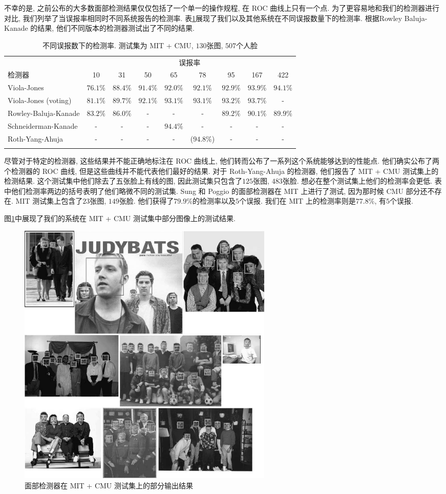 \documentclass[a4paper,utf8,11pt, onecolumn]{ctexart}
\begin{document}
不幸的是, 之前公布的大多数面部检测结果仅仅包括了一个单一的操作规程, 在 ROC 曲线上只有一个点.
为了更容易地和我们的检测器进行对比, 我们列举了当误报率相同时不同系统报告的检测率. 表\ref{tab:false}展现了我们以及其他系统在不同误报数量下的检测率. 根据Rowley Baluja-Kanade 的结果\citep{rowley1998neural}, 他们不同版本的检测器测试出了不同的结果.
\begin{table}
\centering
\begin{tabular}{lcccccccc}
\firsthline
&\multicolumn{8}{c}{误报率} \\
\cline{2-9}
检测器 & 10 & 31 & 50 & 65 & 78 & 95 & 167 & 422 \\
\hline
Viola-Jones & $76.1\%$ & $88.4\%$ & $91.4\%$ & $92.0\%$ & $92.1\%$ & $92.9\%$ & $93.9\%$ & $94.1\%$ \\
Viola-Jones (voting) & $81.1\%$ & $89.7\%$ & $92.1\%$ & $93.1\%$ & $93.1\%$ & $93.2\%$ & $93.7\%$ & - \\
Rowley-Baluja-Kanade & $83.2\%$ & $86.0\%$ & - & - & - & $89.2\%$ & $90.1\%$ & $89.9\%$ \\
Schneiderman-Kanade & - & - & - & $94.4\%$ & - & - & - & - \\
Roth-Yang-Ahuja & - & - & - & - & ($94.8\%$) & - & - & - \\
\lasthline
\end{tabular}
\caption{不同误报数下的检测率. 测试集为 MIT + CMU, $130$张图, $507$个人脸}
\label{tab:false}
\end{table}
尽管对于特定的检测器, 这些结果并不能正确地标注在 ROC 曲线上, 他们转而公布了一系列这个系统能够达到的性能点. 他们确实公布了两个检测器的 ROC 曲线, 但是这些曲线并不能代表他们最好的结果. 
对于 Roth-Yang-Ahuja 的检测器\citep{yang2000snow}, 他们报告了 MIT + CMU 测试集上的检测结果. 这个测试集中他们除去了五张脸上有线的图, 因此测试集只包含了$125$张图, $483$张脸. 想必在整个测试集上他们的检测率会更低. 表中他们检测率两边的括号表明了他们略微不同的测试集.
Sung 和 Poggio 的面部检测器\citep{sung1998example}在 MIT 上进行了测试, 因为那时候 CMU 部分还不存在. MIT 测试集上包含了$23$张图, $149$张脸. 他们获得了$79.9\%$的检测率以及$5$个误报. 我们在 MIT 上的检测率则是$77.8\%$, 有$5$个误报.

图\ref{fig:output}中展现了我们的系统在 MIT + CMU 测试集中部分图像上的测试结果.
\begin{figure}[!b]
\centering
\includegraphics[width=0.6\textwidth]{output.png}
\caption{面部检测器在 MIT + CMU 测试集上的部分输出结果}
\label{fig:output}
\end{figure}
\end{document}
